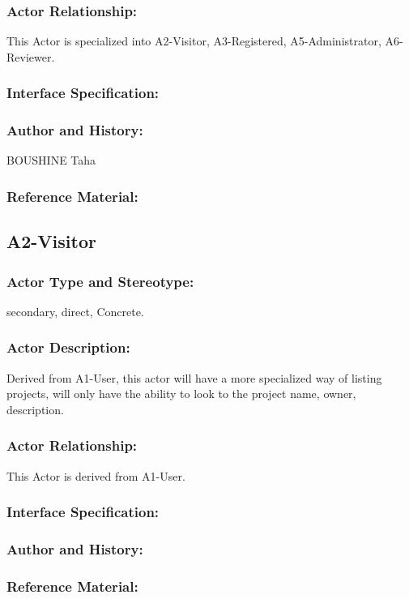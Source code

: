 \documentclass[11pt, openany]{report}
\begin{document}
\subsubsection{Actor Relationship:}
This Actor is specialized into A2-Visitor, A3-Registered, A5-Administrator, A6-Reviewer.

\subsubsection{Interface Specification:}
\subsubsection{Author and History:}
BOUSHINE Taha
\subsubsection{Reference Material:}

\clearpage

\subsection{A2-Visitor}
\label{A2}
\subsubsection{Actor Type and Stereotype:}
secondary, direct, Concrete.
\subsubsection{Actor Description:}
Derived from A1-User, this actor will have a more specialized way of listing projects, will only have the ability to look to the project name, owner, description.
\subsubsection{Actor Relationship:}
This Actor is derived from A1-User.
\subsubsection{Interface Specification:}
\subsubsection{Author and History:}
\subsubsection{Reference Material:}
\end{document}
